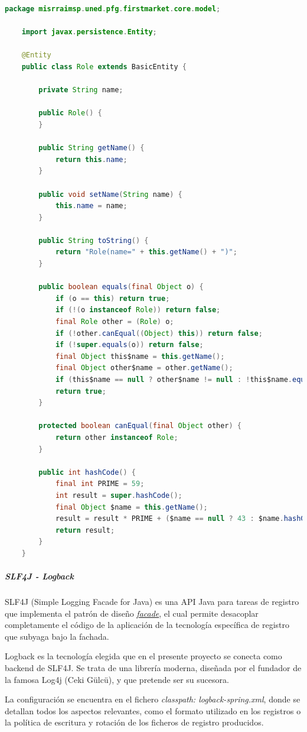 \documentclass[a4paper]{article}
\begin{document}
	\begin{lstlisting}[language=Java,caption=Clase \emph{Role} tras efectuar un \emph{Delombok},label=list:lombok_open]
	package misrraimsp.uned.pfg.firstmarket.core.model;
	
	import javax.persistence.Entity;
	
	@Entity
	public class Role extends BasicEntity {
	
		private String name;
		
		public Role() {
		}
		
		public String getName() {
			return this.name;
		}
		
		public void setName(String name) {
			this.name = name;
		}
		
		public String toString() {
			return "Role(name=" + this.getName() + ")";
		}
		
		public boolean equals(final Object o) {
			if (o == this) return true;
			if (!(o instanceof Role)) return false;
			final Role other = (Role) o;
			if (!other.canEqual((Object) this)) return false;
			if (!super.equals(o)) return false;
			final Object this$name = this.getName();
			final Object other$name = other.getName();
			if (this$name == null ? other$name != null : !this$name.equals(other$name)) return false;
			return true;
		}
		
		protected boolean canEqual(final Object other) {
			return other instanceof Role;
		}
		
		public int hashCode() {
			final int PRIME = 59;
			int result = super.hashCode();
			final Object $name = this.getName();
			result = result * PRIME + ($name == null ? 43 : $name.hashCode());
			return result;
		}
	}
	\end{lstlisting}
	
	\subparagraph{SLF4J - Logback}
	SLF4J (Simple Logging Facade for Java) es una API Java para tareas de registro que implementa el patrón de diseño \href{https://en.wikipedia.org/wiki/Facade_pattern}{\emph{facade}}, el cual permite desacoplar completamente el código de la aplicación de la tecnología específica de registro que subyaga bajo la fachada.
	
	Logback es la tecnología elegida que en el presente proyecto se conecta como backend de SLF4J. Se trata de una librería moderna, diseñada por el fundador de la famosa Log4j (Ceki Gülcü), y que pretende ser su sucesora.
	
	La configuración se encuentra en el fichero \emph{classpath: logback-spring.xml}, donde se detallan todos los aspectos relevantes, como el formato utilizado en los registros o la política de escritura y rotación de los ficheros de registro producidos.
	
\end{document}
